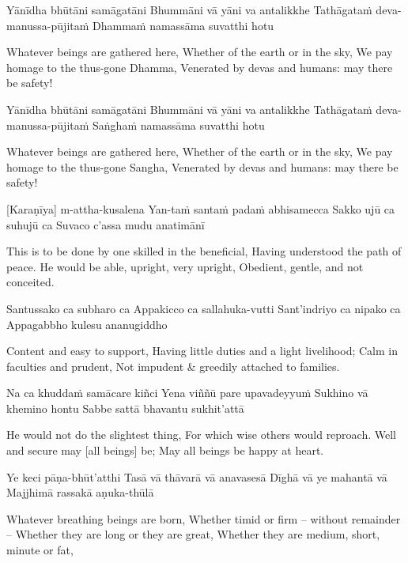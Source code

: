 \begin{english}
\begin{english}
Yānīdha bhūtāni samāgatāni
Bhummāni vā yāni va antalikkhe
Tathāgataṁ deva-manussa-pūjitaṁ
Dhammaṁ namassāma suvatthi hotu

\begin{english}
Whatever beings are gathered here,
Whether of the earth or in the sky,
We pay homage to the thus-gone Dhamma,
Venerated by devas and humans: may there be safety!
\end{english}

Yānīdha bhūtāni samāgatāni
Bhummāni vā yāni va antalikkhe
Tathāgataṁ deva-manussa-pūjitaṁ
Saṅghaṁ namassāma suvatthi hotu

\begin{english}
Whatever beings are gathered here,
Whether of the earth or in the sky,
We pay homage to the thus-gone Sangha,
Venerated by devas and humans: may there be safety!
\end{english}

\suttaRef{[Snp 2.1]}

[Karaṇīya] m-attha-kusalena
Yan-taṁ santaṁ padaṁ abhisamecca
Sakko ujū ca suhujū ca
Suvaco c’assa mudu anatimānī

\begin{english}
This is to be done by one skilled in the beneficial,
Having understood the path of peace.
He would be able, upright, very upright,
Obedient, gentle, and not conceited.
\end{english}

Santussako ca subharo ca
Appakicco ca sallahuka-vutti
Sant’indriyo ca nipako ca
Appagabbho kulesu ananugiddho

\begin{english}
Content and easy to support,
Having little duties and a light livelihood;
Calm in faculties and prudent,
Not impudent \& greedily attached to families.
\end{english}

Na ca khuddaṁ samācare kiñci
Yena viññū pare upavadeyyuṁ
Sukhino vā khemino hontu
Sabbe sattā bhavantu sukhit’attā

\begin{english}
He would not do the slightest thing,
For which wise others would reproach.
Well and secure may [all beings] be;
May all beings be happy at heart.
\end{english}

Ye keci pāṇa-bhūt’atthi
Tasā vā thāvarā vā anavasesā
Dīghā vā ye mahantā vā
Majjhimā rassakā aṇuka-thūlā

\begin{english}
Whatever breathing beings are born,
Whether timid or firm – without remainder –
Whether they are long or they are great,
Whether they are medium, short, minute or fat,
\end{english}


\end{english}
\end{english}
